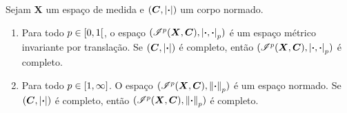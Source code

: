 \begin{proposition}
Sejam $\bm X$ um espaço de medida e $(\bm C,\left\vert{\bm{\cdot}}\right\vert)$ um corpo normado.
	\begin{enumerate}
	\item Para todo $p \in \left[{0},{1}\right[$, o espaço $(\mathscr{I}^p(\bm X,\bm C),\left\vert{\bm{\cdot}},{\bm{\cdot}}\right\vert_p)$ é um espaço métrico invariante por translação. Se $(\bm C,\left\vert{\bm{\cdot}}\right\vert)$ é completo, então $(\mathscr{I}^p(\bm X,\bm C),\left\vert{\bm{\cdot}},{\bm{\cdot}}\right\vert_p)$ é completo.
	
	\item Para todo $p \in \left[{1},{\infty}\right]$. O espaço $(\mathscr{I}^p(\bm X,\bm C),\left\Vert{\bm{\cdot}}\right\Vert_p)$ é um espaço normado. Se $(\bm C,\left\vert{\bm{\cdot}}\right\vert)$ é completo, então $(\mathscr{I}^p(\bm X,\bm C),\left\Vert{\bm{\cdot}}\right\Vert_p)$ é completo.
	\end{enumerate}
\end{proposition}
